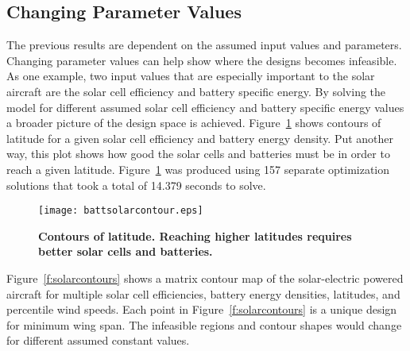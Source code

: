 \subsection{Changing Parameter Values}

The previous results are dependent on the assumed input values and parameters.  
Changing parameter values can help show where the designs becomes infeasible. 
As one example, two input values that are especially important to the solar aircraft are the solar cell efficiency and battery specific energy. 
By solving the model for different assumed solar cell efficiency and battery specific energy values a broader picture of the design space is achieved.   
Figure~\ref{f:battsolarcontour} shows contours of latitude for a given solar cell efficiency and battery energy density.  
Put another way, this plot shows how good the solar cells and batteries must be in order to reach a given latitude. 
Figure~\ref{f:battsolarcontour} was produced using 157 separate optimization solutions that took a total of 14.379 seconds to solve. 

\begin{figure}[H]
	\begin{center}
	\texttt{[image: battsolarcontour.eps]}
    \caption{\textbf{Contours of latitude. Reaching higher latitudes requires better solar cells and batteries.}}
	\label{f:battsolarcontour}
	\end{center}
\end{figure}

Figure~\ref{f:solarcontours} shows a matrix contour map of the solar-electric powered aircraft for multiple solar cell efficiencies, battery energy densities, latitudes, and percentile wind speeds.
Each point in Figure~\ref{f:solarcontours} is a unique design for minimum wing span. 
The infeasible regions and contour shapes would change for different assumed constant values. 

